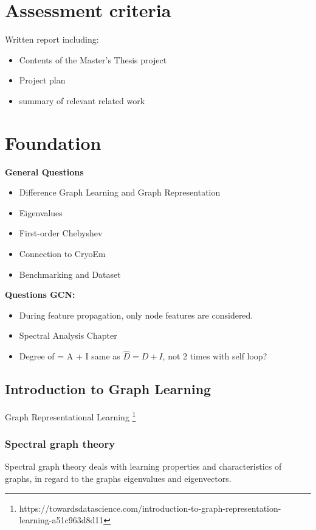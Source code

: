 \chapter{Assessment criteria}
Written report including: 
\begin{itemize}
    \item Contents of the Master's Thesis project
    \item Project plan
    \item summary of relevant related work
\end{itemize}

\chapter{Foundation}



\textbf{General Questions}
\begin{itemize}
    \item Difference Graph Learning and Graph Representation
    \item Eigenvalues
    \item First-order Chebyshev
    \item Connection to CryoEm
    \item Benchmarking and Dataset
\end{itemize}

\textbf{Questions GCN:}
\begin{itemize}
    \item During feature propagation, only node features are considered.
    \item Spectral Analysis Chapter
    \item Degree of = A + I same as $\hat{D} = D + I$, not 2 times with self loop?
\end{itemize}

\section{Introduction to Graph Learning}

Graph Representational Learning
\footnote{https://towardsdatascience.com/introduction-to-graph-representation-learning-a51c963d8d11}


\subsection{Spectral graph theory}
Spectral graph theory \cite{SpectralGraphTheory} deals with learning properties and characteristics of graphs, in regard to
the graphs eigenvalues and eigenvectors. 

